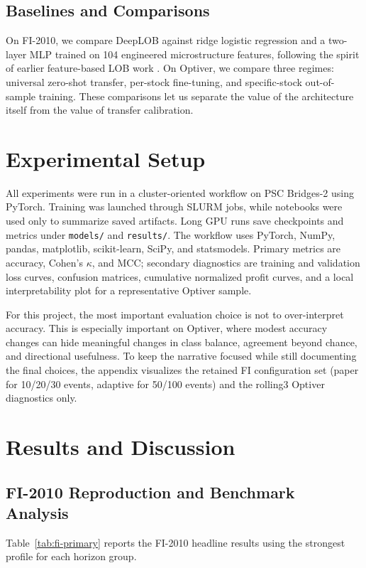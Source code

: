 \documentclass[11pt]{article}
\begin{document}
\subsection{Baselines and Comparisons}
On FI-2010, we compare DeepLOB against ridge logistic regression and a two-layer MLP trained on 104 engineered microstructure features, following the spirit of earlier feature-based LOB work \cite{kercheval2015modelling}. On Optiver, we compare three regimes: universal zero-shot transfer, per-stock fine-tuning, and specific-stock out-of-sample training. These comparisons let us separate the value of the architecture itself from the value of transfer calibration.

\section{Experimental Setup}
All experiments were run in a cluster-oriented workflow on PSC Bridges-2 using PyTorch. Training was launched through SLURM jobs, while notebooks were used only to summarize saved artifacts. Long GPU runs save checkpoints and metrics under \texttt{models/} and \texttt{results/}. The workflow uses PyTorch, NumPy, pandas, matplotlib, scikit-learn, SciPy, and statsmodels. Primary metrics are accuracy, Cohen's $\kappa$, and MCC; secondary diagnostics are training and validation loss curves, confusion matrices, cumulative normalized profit curves, and a local interpretability plot for a representative Optiver sample.

For this project, the most important evaluation choice is not to over-interpret accuracy. This is especially important on Optiver, where modest accuracy changes can hide meaningful changes in class balance, agreement beyond chance, and directional usefulness. To keep the narrative focused while still documenting the final choices, the appendix visualizes the retained FI configuration set (paper for 10/20/30 events, adaptive for 50/100 events) and the rolling3 Optiver diagnostics only.

\section{Results and Discussion}
\subsection{FI-2010 Reproduction and Benchmark Analysis}
Table~\ref{tab:fi-primary} reports the FI-2010 headline results using the strongest profile for each horizon group.
\end{document}
